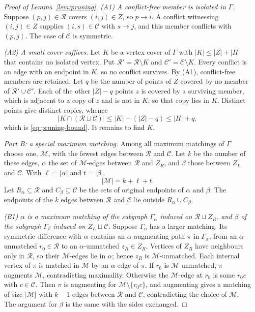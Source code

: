 \documentclass[11pt]{article}
\theoremstyle{remark}
\newcommand{\abs}[1]{\lvert #1\rvert}
\begin{document}
\begin{proof}[Proof of Lemma~\ref{lem:pruning}]
\emph{(A1) A conflict-free member is isolated in $\Gamma$.}
Suppose $(p,j)\in\mathcal R$ covers $(i,j)\in Z$, so $p\to i$.  A conflict
witnessing $(i,j)\in Z$ supplies $(i,s)\in\mathcal C$ with $s\to j$, and
this member conflicts with $(p,j)$.  The case of $\mathcal C$ is symmetric.

\emph{(A2) A small cover suffices.}
Let $K$ be a vertex cover of $\Gamma$ with $\abs K\le\abs Z+\abs H$ that
contains no isolated vertex.  Put $\mathcal R'=\mathcal R\setminus K$ and
$\mathcal C'=\mathcal C\setminus K$.  Every conflict is an edge with an
endpoint in $K$, so no conflict survives.  By (A1), conflict-free members
are retained.  Let $q$ be the number of points of $Z$ covered by no member
of $\mathcal R'\cup\mathcal C'$.  Each of the other $\abs Z-q$ points $z$ is
covered by a surviving member, which is adjacent to a copy of $z$ and is not
in $K$; so that copy lies in $K$.  Distinct points give distinct copies,
whence
\begin{equation}\label{eq:cover-charge}
 \abs{K\cap(\mathcal R\sqcup\mathcal C)}
 \leq \abs K-(\abs Z-q)\leq\abs H+q,
\end{equation}
which is \eqref{eq:pruning-bound}.  It remains to find $K$.

\medskip\noindent
\emph{Part B: a special maximum matching.}
Among all maximum matchings of $\Gamma$ choose one, $\mathcal M$, with the
fewest edges between $\mathcal R$ and $\mathcal C$.  Let $k$ be the number of
these edges, $\alpha$ the set of $\mathcal M$-edges between $\mathcal R$ and
$Z_R$, and $\beta$ those between $Z_L$ and $\mathcal C$.  With
$\ell=\abs\alpha$ and $t=\abs\beta$,
\[
 \abs{\mathcal M}=k+\ell+t.
\]
Let $R_\alpha\subseteq\mathcal R$ and $C_\beta\subseteq\mathcal C$ be the
sets of original endpoints of $\alpha$ and $\beta$.  The endpoints of the
$k$ edges between $\mathcal R$ and $\mathcal C$ lie outside
$R_\alpha\cup C_\beta$.

\emph{(B1) $\alpha$ is a maximum matching of the subgraph $\Gamma_\alpha$
induced on $\mathcal R\sqcup Z_R$, and $\beta$ of the subgraph
$\Gamma_\beta$ induced on $Z_L\sqcup\mathcal C$.}
Suppose $\Gamma_\alpha$ has a larger matching.  Its symmetric difference
with $\alpha$ contains an $\alpha$-augmenting path $\pi$ in $\Gamma_\alpha$,
from an $\alpha$-unmatched $r_0\in\mathcal R$ to an $\alpha$-unmatched
$z_R\in Z_R$.  Vertices of $Z_R$ have neighbours only in $\mathcal R$, so
their $\mathcal M$-edges lie in $\alpha$; hence $z_R$ is
$\mathcal M$-unmatched.  Each internal vertex of $\pi$ is matched in
$\mathcal M$ by an $\alpha$-edge of $\pi$.  If $r_0$ is
$\mathcal M$-unmatched, $\pi$ augments $\mathcal M$, contradicting
maximality.  Otherwise the $\mathcal M$-edge at $r_0$ is some $r_0c$ with
$c\in\mathcal C$.  Then $\pi$ is augmenting for
$\mathcal M\setminus\{r_0c\}$, and augmenting gives a matching of size
$\abs{\mathcal M}$ with $k-1$ edges between $\mathcal R$ and $\mathcal C$,
contradicting the choice of $\mathcal M$.  The argument for $\beta$ is the
same with the sides exchanged.


\end{proof}
\end{document}
